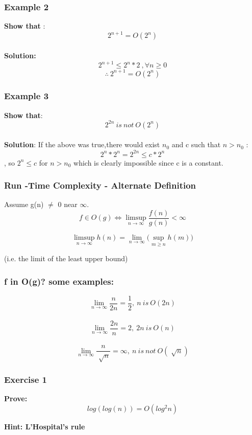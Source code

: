 \documentclass{beamer}
\begin{document}
\begin{frame}
\frametitle{Example 2}
\textbf{Show that }: $$2^{n+1}=O(2^n)$$ \\
 
\textbf{Solution:} $$2^{n+1}\leq 2^n*2 \ , \forall n\geq 0 $$ 
 $$\therefore \ 2^{n+1}=O(2^n)$$

\end{frame}

 

\begin{frame}
\frametitle{Example 3}
\textbf{Show that}: $$2^{2n}\ is \ not \ O(2^n)$$\\
 
\textbf{Solution}: If the above was true,there would exist $n_{0}$ and c such that $n>n_{0}$ :
$$2^{n}*2^{n} =2^{2n} \leq c*2^n  $$ ,
so $2^{n}\leq c$ for $n>n_{0}$ which is clearly impossible since c is a constant. 

\end{frame}

\begin{frame}
\frametitle{Run -Time Complexity - Alternate Definition}
 

Assume g(n) $\ne $ 0 near $\infty$. \\

$$f \in O(g) \iff   \limsup\limits_{n\rightarrow \infty} \frac{f(n)}{g(n)} < \infty  $$ 

$$\limsup\limits_{n\rightarrow \infty} h(n) = \lim\limits_{n\to \infty} \Big (\sup_{m\geq n} h(m) \Big)$$ 

  (i.e. the limit of the least upper bound) 
 
\end{frame}
 
 


\begin{frame}
\frametitle{f in O(g)? some examples:}
 $$\lim_{n \to \infty} \frac{n}{2n}  = \frac{1}{2}, \ n \
 is \ O(2n)$$\\
 
  $$\lim_{n \to \infty} \frac{2n}{n}  = 2, \ 2n \ is \ O(n)$$ \\
  
  $$\lim_{n \to \infty}  \frac{ n}{\sqrt[]{n} } =\infty, \ n \ is \ not \ O(\sqrt[]{n} )$$  
  

  \end{frame}

\begin{frame}
\frametitle{Exercise 1}
\textbf{Prove:} $$log(log(n))=O(log^{2}n)$$
 



{\color{blue}\textbf{Hint: L'Hospital's rule} }
\vspace{2cm}
  
\end{frame}
\end{document}
